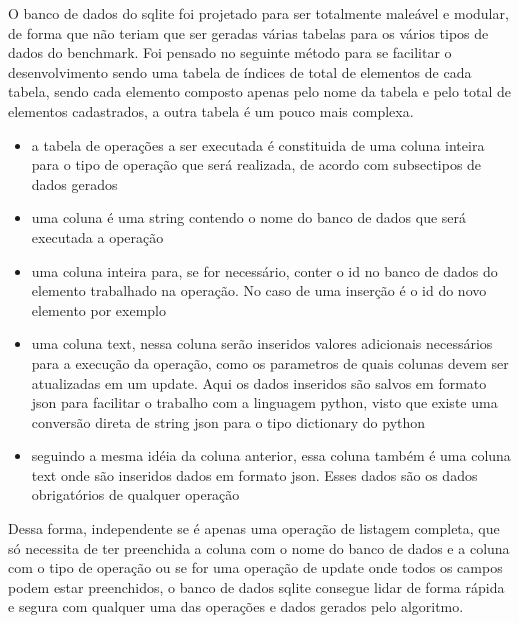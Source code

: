 \documentclass[
	12pt,				%
	openright,			%
	oneside,			%
	a4paper,			%
	english,			%
	french,				%
	spanish,			%
	brazil,				%
	]{abntex2}
\begin{document}
O banco de dados do sqlite foi projetado para ser totalmente maleável e modular,
de forma que não teriam que ser geradas várias tabelas para os vários tipos de dados do benchmark.
Foi pensado no seguinte método para se facilitar o desenvolvimento sendo uma tabela de índices de total de elementos de cada tabela,
sendo cada elemento composto apenas pelo nome da tabela e pelo total de elementos cadastrados, a outra tabela é um pouco mais complexa.
\begin{itemize}
    \item a tabela de operações a ser executada é constituida de uma coluna inteira para o tipo de operação que será realizada, de acordo com {subsec}{tipos de dados gerados}
    \item uma coluna é uma string contendo o nome do banco de dados que será executada a operação
    \item uma coluna inteira para, se for necessário, conter o id no banco de dados do elemento trabalhado na operação. No caso de uma inserção é o id do novo elemento por exemplo
    \item uma coluna text, nessa coluna serão inseridos valores adicionais necessários para a execução da operação, como os parametros de quais colunas devem ser atualizadas em um update.
    Aqui os dados inseridos são salvos em formato json para facilitar o trabalho com a linguagem python, visto que existe uma conversão direta de string json para o tipo dictionary do python
    \item seguindo a mesma idéia da coluna anterior, essa coluna também é uma coluna text onde são inseridos dados em formato json. Esses dados são os dados obrigatórios de qualquer operação
\end{itemize}
 Dessa forma, independente se é apenas uma operação de listagem completa,
 que só necessita de ter preenchida a coluna com o nome do banco de dados e a coluna com o tipo de operação ou se for uma operação de update onde todos os campos podem estar preenchidos,
 o banco de dados sqlite consegue lidar de forma rápida e segura com qualquer uma das operações e dados gerados pelo algoritmo.
\end{document}
